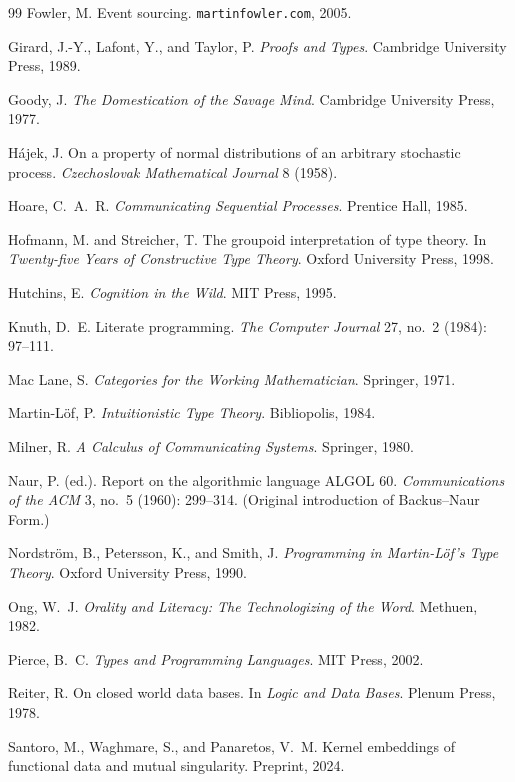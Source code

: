 \documentclass[12pt, a4paper, openany]{book}
\theoremstyle{plain}
\theoremstyle{definition}
\theoremstyle{remark}
\begin{document}
\begin{thebibliography}{99}
Fowler, M. Event sourcing. \texttt{martinfowler.com}, 2005.

Girard, J.-Y., Lafont, Y., and Taylor, P. \emph{Proofs and Types}. Cambridge
University Press, 1989.

Goody, J. \emph{The Domestication of the Savage Mind}. Cambridge University
Press, 1977.

H\'ajek, J. On a property of normal distributions of an arbitrary stochastic
process. \emph{Czechoslovak Mathematical Journal} 8 (1958).

Hoare, C.~A.~R. \emph{Communicating Sequential Processes}. Prentice Hall, 1985.

Hofmann, M. and Streicher, T. The groupoid interpretation of type theory.
In \emph{Twenty-five Years of Constructive Type Theory}. Oxford University Press,
1998.

Hutchins, E. \emph{Cognition in the Wild}. MIT Press, 1995.

Knuth, D.~E. Literate programming. \emph{The Computer Journal} 27, no.~2
(1984): 97--111.

Mac Lane, S. \emph{Categories for the Working Mathematician}. Springer, 1971.

Martin-L\"of, P. \emph{Intuitionistic Type Theory}. Bibliopolis, 1984.

Milner, R. \emph{A Calculus of Communicating Systems}. Springer, 1980.

Naur, P. (ed.). Report on the algorithmic language ALGOL 60.
\emph{Communications of the ACM} 3, no.~5 (1960): 299--314.
(Original introduction of Backus--Naur Form.)

Nordstr\"om, B., Petersson, K., and Smith, J. \emph{Programming in
Martin-L\"of's Type Theory}. Oxford University Press, 1990.

Ong, W.~J. \emph{Orality and Literacy: The Technologizing of the Word}.
Methuen, 1982.

Pierce, B.~C. \emph{Types and Programming Languages}. MIT Press, 2002.

Reiter, R. On closed world data bases. In \emph{Logic and Data Bases}. Plenum
Press, 1978.

Santoro, M., Waghmare, S., and Panaretos, V.~M. Kernel embeddings of functional
data and mutual singularity. Preprint, 2024.


\end{thebibliography}
\end{document}
